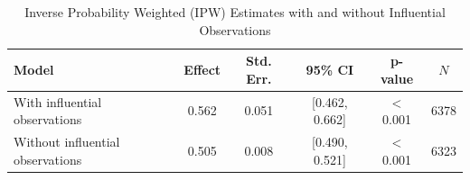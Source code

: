 \documentclass[10pt,letterpaper]{article}
\begin{document}
\begin{table}[htbp]
\centering
\caption{Inverse Probability Weighted (IPW) Estimates with and without Influential Observations}
\label{tab:ipw-results}
\begin{tabular}{lccccc}
\toprule
Model & Effect & Std. Err. & 95\% CI & p-value & $N$ \\
\midrule
With influential observations 
& 0.562 & 0.051 & [0.462, 0.662] & $<$0.001 & 6378 \\

Without influential observations 
& 0.505 & 0.008 & [0.490, 0.521] & $<$0.001 & 6323 \\

\bottomrule
\end{tabular}
\end{table}








\end{document}
